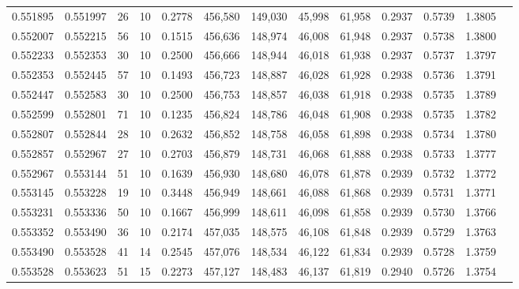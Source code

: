 \begin{tabular}{rrrrrrrrrrrrr}
0.551895 & 0.551997 &    26 &  10 &                                     0.2778 & 456,580 & 149,030 &  45,998 &  61,958 & 0.2937 & 0.5739 & 1.3805 \\
0.552007 & 0.552215 &    56 &  10 &                                     0.1515 & 456,636 & 148,974 &  46,008 &  61,948 & 0.2937 & 0.5738 & 1.3800 \\
0.552233 & 0.552353 &    30 &  10 &                                     0.2500 & 456,666 & 148,944 &  46,018 &  61,938 & 0.2937 & 0.5737 & 1.3797 \\
0.552353 & 0.552445 &    57 &  10 &                                     0.1493 & 456,723 & 148,887 &  46,028 &  61,928 & 0.2938 & 0.5736 & 1.3791 \\
0.552447 & 0.552583 &    30 &  10 &                                     0.2500 & 456,753 & 148,857 &  46,038 &  61,918 & 0.2938 & 0.5735 & 1.3789 \\
0.552599 & 0.552801 &    71 &  10 &                                     0.1235 & 456,824 & 148,786 &  46,048 &  61,908 & 0.2938 & 0.5735 & 1.3782 \\
0.552807 & 0.552844 &    28 &  10 &                                     0.2632 & 456,852 & 148,758 &  46,058 &  61,898 & 0.2938 & 0.5734 & 1.3780 \\
0.552857 & 0.552967 &    27 &  10 &                                     0.2703 & 456,879 & 148,731 &  46,068 &  61,888 & 0.2938 & 0.5733 & 1.3777 \\
0.552967 & 0.553144 &    51 &  10 &                                     0.1639 & 456,930 & 148,680 &  46,078 &  61,878 & 0.2939 & 0.5732 & 1.3772 \\
0.553145 & 0.553228 &    19 &  10 &                                     0.3448 & 456,949 & 148,661 &  46,088 &  61,868 & 0.2939 & 0.5731 & 1.3771 \\
0.553231 & 0.553336 &    50 &  10 &                                     0.1667 & 456,999 & 148,611 &  46,098 &  61,858 & 0.2939 & 0.5730 & 1.3766 \\
0.553352 & 0.553490 &    36 &  10 &                                     0.2174 & 457,035 & 148,575 &  46,108 &  61,848 & 0.2939 & 0.5729 & 1.3763 \\
0.553490 & 0.553528 &    41 &  14 &                                     0.2545 & 457,076 & 148,534 &  46,122 &  61,834 & 0.2939 & 0.5728 & 1.3759 \\
0.553528 & 0.553623 &    51 &  15 &                                     0.2273 & 457,127 & 148,483 &  46,137 &  61,819 & 0.2940 & 0.5726 & 1.3754 \\

\end{tabular}
